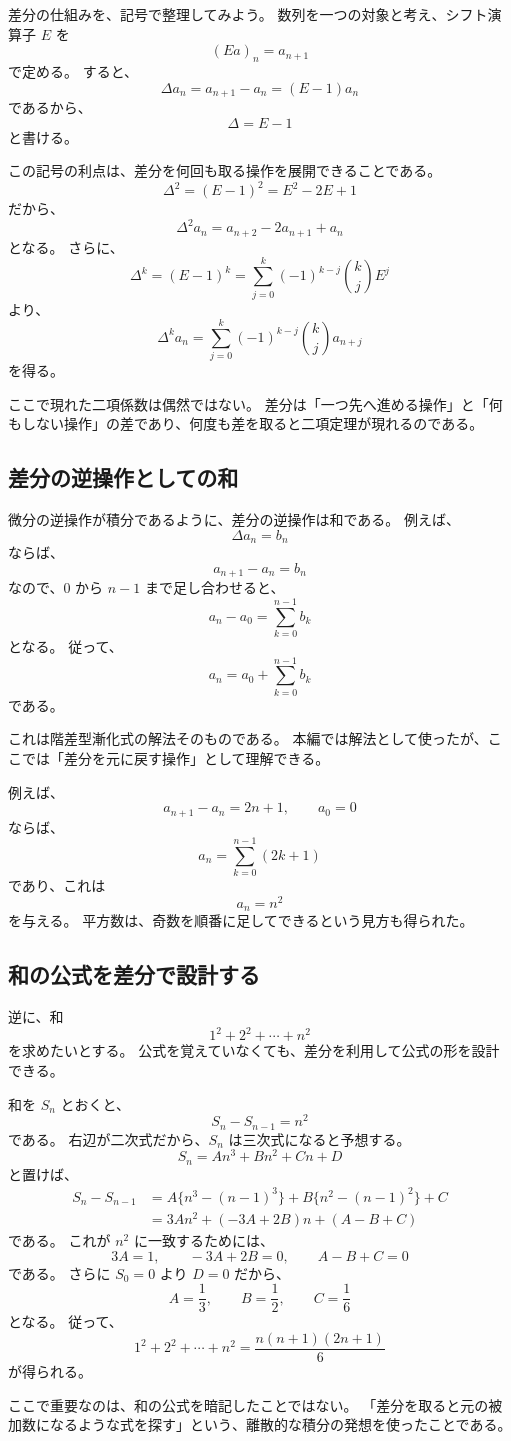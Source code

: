 差分の仕組みを、記号で整理してみよう。
数列を一つの対象と考え、シフト演算子 $E$ を
\[
  (Ea)_n=a_{n+1}
\]
で定める。
すると、
\[
  \Delta a_n=a_{n+1}-a_n=(E-1)a_n
\]
であるから、
\[
  \Delta=E-1
\]
と書ける。

この記号の利点は、差分を何回も取る操作を展開できることである。
\[
  \Delta^2=(E-1)^2=E^2-2E+1
\]
だから、
\[
  \Delta^2a_n=a_{n+2}-2a_{n+1}+a_n
\]
となる。
さらに、
\[
  \Delta^k=(E-1)^k
  =\sum_{j=0}^{k}(-1)^{k-j}\binom{k}{j}E^j
\]
より、
\[
  \Delta^ka_n
  =\sum_{j=0}^{k}(-1)^{k-j}\binom{k}{j}a_{n+j}
\]
を得る。

ここで現れた二項係数は偶然ではない。
差分は「一つ先へ進める操作」と「何もしない操作」の差であり、何度も差を取ると二項定理が現れるのである。

\subsection{差分の逆操作としての和}

微分の逆操作が積分であるように、差分の逆操作は和である。
例えば、
\[
  \Delta a_n=b_n
\]
ならば、
\[
  a_{n+1}-a_n=b_n
\]
なので、$0$ から $n-1$ まで足し合わせると、
\[
  a_n-a_0=\sum_{k=0}^{n-1}b_k
\]
となる。
従って、
\[
  a_n=a_0+\sum_{k=0}^{n-1}b_k
\]
である。

これは階差型漸化式の解法そのものである。
本編では解法として使ったが、ここでは「差分を元に戻す操作」として理解できる。

例えば、
\[
  a_{n+1}-a_n=2n+1,\qquad a_0=0
\]
ならば、
\[
  a_n=\sum_{k=0}^{n-1}(2k+1)
\]
であり、これは
\[
  a_n=n^2
\]
を与える。
平方数は、奇数を順番に足してできるという見方も得られた。

\subsection{和の公式を差分で設計する}

逆に、和
\[
  1^2+2^2+\cdots+n^2
\]
を求めたいとする。
公式を覚えていなくても、差分を利用して公式の形を設計できる。

和を $S_n$ とおくと、
\[
  S_n-S_{n-1}=n^2
\]
である。
右辺が二次式だから、$S_n$ は三次式になると予想する。
\[
  S_n=An^3+Bn^2+Cn+D
\]
と置けば、
\[
  \begin{aligned}
    S_n-S_{n-1}
     & =
    A\{n^3-(n-1)^3\}
    +B\{n^2-(n-1)^2\}
    +C   \\
     & =
    3An^2+(-3A+2B)n+(A-B+C)
  \end{aligned}
\]
である。
これが $n^2$ に一致するためには、
\[
  3A=1,\qquad -3A+2B=0,\qquad A-B+C=0
\]
である。
さらに $S_0=0$ より $D=0$ だから、
\[
  A=\frac13,\qquad B=\frac12,\qquad C=\frac16
\]
となる。
従って、
\[
  1^2+2^2+\cdots+n^2
  =\frac{n(n+1)(2n+1)}6
\]
が得られる。

ここで重要なのは、和の公式を暗記したことではない。
「差分を取ると元の被加数になるような式を探す」という、離散的な積分の発想を使ったことである。
